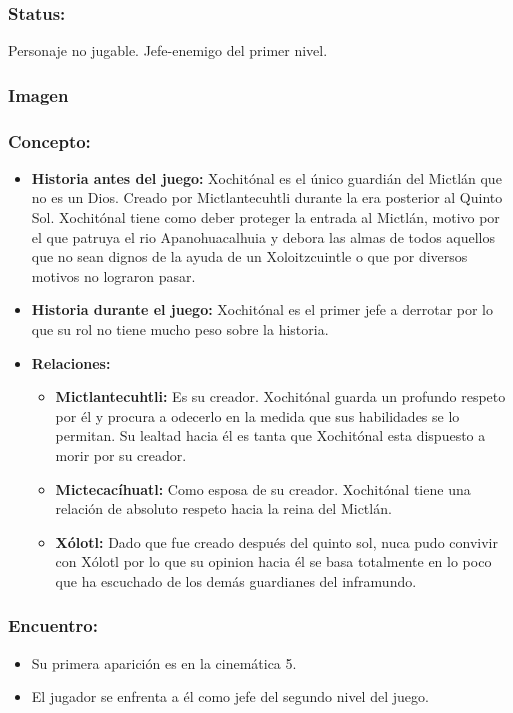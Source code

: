 \documentclass[11pt,letterpaper]{article}
\begin{document}
\subsubsection{Status:}
Personaje no jugable.
Jefe-enemigo del primer nivel.
\subsubsection{Imagen}
\subsubsection{Concepto:}
\begin{itemize}
	\item \textbf{Historia antes del juego:}
	Xochitónal es el único guardián del Mictlán que no es un Dios. Creado por Mictlantecuhtli durante la era posterior al Quinto Sol. Xochitónal tiene como deber proteger la entrada al Mictlán, motivo por el que patruya el rio Apanohuacalhuia y debora las almas de todos aquellos que no sean dignos de la ayuda de un Xoloitzcuintle o que por diversos motivos no lograron pasar.
	\item \textbf{Historia durante el juego:}
	Xochitónal es el primer jefe a derrotar por lo que su rol no tiene mucho peso sobre la historia.
	\item \textbf{Relaciones:}
	\begin{itemize}
		\item \textbf{Mictlantecuhtli:} Es su creador. Xochitónal guarda un profundo respeto por él y procura a odecerlo en la medida que sus habilidades se lo permitan. Su lealtad hacia él es tanta que Xochitónal esta dispuesto a morir por su creador.
		\item \textbf{Mictecacíhuatl:} Como esposa de su creador. Xochitónal tiene una relación de absoluto respeto hacia la reina del Mictlán. 
		\item \textbf{Xólotl:} Dado que fue creado después del quinto sol, nuca pudo convivir con Xólotl por lo que su opinion hacia él se basa totalmente en lo poco que ha escuchado de los demás guardianes del inframundo.
	\end{itemize}			  
\end{itemize} 
\subsubsection{Encuentro:}
\begin{itemize}
	\item Su primera aparición es en la cinemática 5. 
	\item El jugador se enfrenta a él como jefe del segundo nivel del juego.
\end{itemize}
\end{document}
